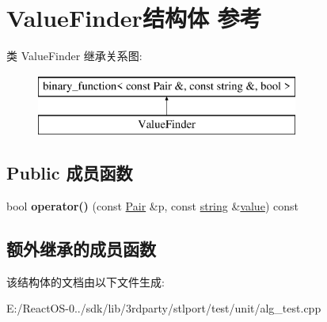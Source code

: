 \hypertarget{struct_value_finder}{}\section{Value\+Finder结构体 参考}
\label{struct_value_finder}
类 Value\+Finder 继承关系图\+:\begin{figure}[H]
\begin{center}
\leavevmode
\includegraphics[height=2.000000cm]{struct_value_finder}
\end{center}
\end{figure}
\subsection*{Public 成员函数}
\begin{DoxyCompactItemize}
\item 
\mbox{\label{struct_value_finder_af4210aaff1f740a888da1bc6eca5fec0}} 
bool {\bfseries operator()} (const \hyperlink{structpair}{Pair} \&p, const \hyperlink{structstring}{string} \&\hyperlink{unionvalue}{value}) const
\end{DoxyCompactItemize}
\subsection*{额外继承的成员函数}


该结构体的文档由以下文件生成\+:\begin{DoxyCompactItemize}
\item 
E\+:/\+React\+O\+S-\/0../sdk/lib/3rdparty/stlport/test/unit/alg\+\_\+test.\+cpp\end{DoxyCompactItemize}
